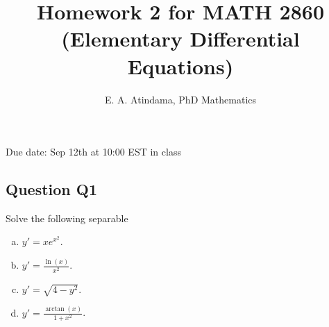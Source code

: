\documentclass[a4paper,11pt,reqno]{amsart}
\title[MATH 2860 (Elementary Differential Equations)]{Homework 2 for MATH 2860 (Elementary Differential Equations)}
\author[Emmanuel Atindama]{E. A. Atindama, PhD Mathematics}
\numberwithin{equation}{section}
\begin{document}
\maketitle

Due date: Sep 12th at 10:00 EST in class

\subsection*{Question Q1}
  Solve the following separable \ode{}
  \begin{enumerate}[a)]
  \item $\displaystyle y' = x e^{x^2}$.
  \item $\displaystyle y' = \frac{\ln(x)}{x^2}$.
  \item $\displaystyle y' = \sqrt{4-y^2}$.
  \item $\displaystyle y' = \frac{\arctan(x)}{1+x^2}$.
\end{enumerate}
\end{document}
